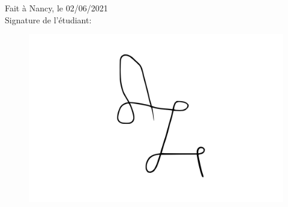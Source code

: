 \begin{flushright}
Fait à Nancy, le 02/06/2021 \\
Signature de l'étudiant:
\end{flushright}
\begin{figure}[!h]
    \begin{flushright}
         \includegraphics[scale=0.3]{Images/Signatures/Signature_AZ.png}
    \end{flushright}
\end{figure}